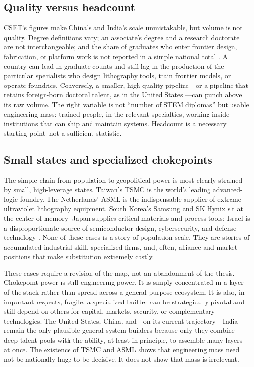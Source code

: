 \documentclass[12pt,letterpaper]{article}
\begin{document}
\subsection{Quality versus headcount}

CSET's figures make China's and India's scale unmistakable, but volume is not quality. Degree definitions vary; an associate's degree and a research doctorate are not interchangeable; and the share of graduates who enter frontier design, fabrication, or platform work is not reported in a simple national total \cite{oliss2023}. A country can lead in graduate counts and still lag in the production of the particular specialists who design lithography tools, train frontier models, or operate foundries. Conversely, a smaller, high-quality pipeline---or a pipeline that retains foreign-born doctoral talent, as in the United States \cite{nasem2024}---can punch above its raw volume. The right variable is not ``number of STEM diplomas'' but usable engineering mass: trained people, in the relevant specialties, working inside institutions that can ship and maintain systems. Headcount is a necessary starting point, not a sufficient statistic.

\subsection{Small states and specialized chokepoints}

The simple chain from population to geopolitical power is most clearly strained by small, high-leverage states. Taiwan's TSMC is the world's leading advanced-logic foundry. The Netherlands' ASML is the indispensable supplier of extreme-ultraviolet lithography equipment. South Korea's Samsung and SK Hynix sit at the center of memory; Japan supplies critical materials and process tools; Israel is a disproportionate source of semiconductor design, cybersecurity, and defense technology \cite{miller2022}. None of these cases is a story of population scale. They are stories of accumulated industrial skill, specialized firms, and, often, alliance and market positions that make substitution extremely costly.

These cases require a revision of the map, not an abandonment of the thesis. Chokepoint power is still engineering power. It is simply concentrated in a layer of the stack rather than spread across a general-purpose ecosystem. It is also, in important respects, fragile: a specialized builder can be strategically pivotal and still depend on others for capital, markets, security, or complementary technologies. The United States, China, and---on its current trajectory---India remain the only plausible general system-builders because only they combine deep talent pools with the ability, at least in principle, to assemble many layers at once. The existence of TSMC and ASML shows that engineering mass need not be nationally huge to be decisive. It does not show that mass is irrelevant.
\end{document}
